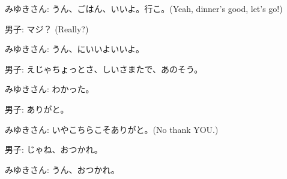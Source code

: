\documentclass{article}
\begin{document}
\begin{itemize}
    みゆきさん: うん、ごはん、いいよ。行こ。(Yeah, dinner's good, let's go!)

    男子: マジ？ (Really?)

    みゆきさん: うん、にいいよいいよ。

    男子: えじゃちょっとさ、しいさまたで、あのそう。

    みゆきさん: わかった。

    男子: ありがと。

    みゆきさん: いやこちらこそありがと。(No thank YOU.)

    男子: じゃね、おつかれ。

    みゆきさん: うん、おつかれ。
\end{itemize}
\end{document}
